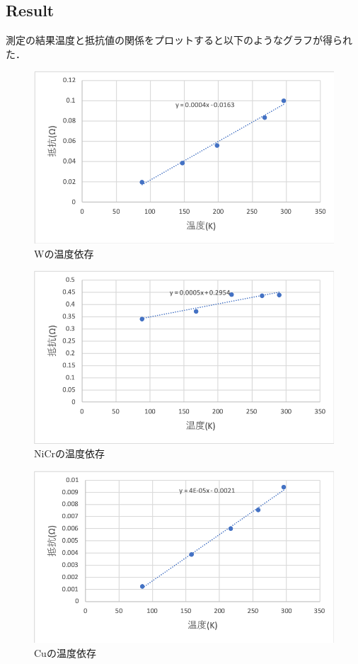 \documentclass[11pt, a4paper,twocolumn]{jarticle}
\begin{document}
\subsection{Result}
測定の結果温度と抵抗値の関係をプロットすると以下のようなグラフが得られた．

\begin{figure}[htbp]
 \begin{center}
  \includegraphics[width=0.8\linewidth]{fig30.png}
 \end{center}
 \caption{Wの温度依存}
 \label{fig:30}
\end{figure}

\begin{figure}[htbp]
 \begin{center}
  \includegraphics[width=0.8\linewidth]{fig31.png}
 \end{center}
 \caption{NiCrの温度依存}
 \label{fig:31}
\end{figure}

\begin{figure}[htbp]
 \begin{center}
  \includegraphics[width=0.8\linewidth]{fig32.png}
 \end{center}
 \caption{Cuの温度依存}
 \label{fig:32}
\end{figure}
\end{document}
